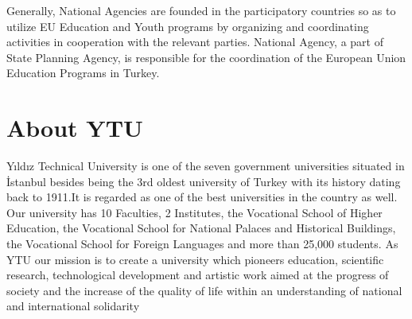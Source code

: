 Generally, National Agencies are founded in the participatory countries so as to utilize EU Education and Youth programs by organizing and coordinating activities in cooperation with the relevant parties.
National Agency, a part of State Planning Agency, is responsible for the coordination of the European Union Education Programs in Turkey.

\section{About YTU}
Yıldız Technical University is one of the seven government universities situated in İstanbul besides being the 3rd oldest university of Turkey with its history dating back to 1911.It is regarded as one of the best universities in the country as well. Our university has 10 Faculties, 2 Institutes, the Vocational School of Higher Education, the Vocational School for National Palaces and Historical Buildings, the Vocational School for Foreign Languages and more than 25,000 students. 
As YTU our mission is to create a university which pioneers education, scientific research, technological development and artistic work aimed at the progress of society and the increase of the quality of life within an understanding of national and international solidarity

